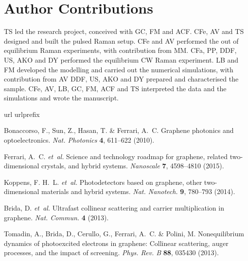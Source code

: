 \documentclass[aps, prl,twocolumn]{revtex4}
\begin{document}
\section*{Author Contributions}
TS led the research project, conceived with GC, FM and ACF.
CFe, AV and TS designed and built the pulsed Raman setup.
CFe and AV performed the out of equilibrium Raman experiments, with contribution from MM.
CFa, PP, DDF, US, AKO and DY performed the equilibrium CW Raman experiment.
LB and FM developed the modelling and carried out the numerical simulations, with contribution from AV
DDF, US, AKO and DY prepared and characterised the sample.
CFe, AV, LB, GC, FM, ACF and TS interpreted the data and the simulations and wrote the manuscript.

\begin{thebibliography}{10}
	\expandafter\ifx\csname url\endcsname\relax
	\def\url#1{\texttt{#1}}\fi
	\expandafter\ifx\csname urlprefix\endcsname\relax\def\urlprefix{URL }\fi
	\providecommand{\bibinfo}[2]{#2}
	\providecommand{\eprint}[2][]{\url{#2}}
	
	\bibinfo{author}{Bonaccorso, F.}, \bibinfo{author}{Sun, Z.},
	\bibinfo{author}{Hasan, T.} \& \bibinfo{author}{Ferrari, A.~C.}
	\newblock \bibinfo{title}{Graphene photonics and optoelectronics}.
	\newblock \emph{\bibinfo{journal}{Nat. Photonics}} \textbf{\bibinfo{volume}{4}},
	\bibinfo{pages}{611--622} (\bibinfo{year}{2010}).
	
	\bibinfo{author}{Ferrari, A.~C.} \emph{et~al.}
	\newblock \bibinfo{title}{Science and technology roadmap for graphene{,}
		related two-dimensional crystals{,} and hybrid systems}.
	\newblock \emph{\bibinfo{journal}{Nanoscale}} \textbf{\bibinfo{volume}{7}},
	\bibinfo{pages}{4598--4810} (\bibinfo{year}{2015}).
	
	\bibinfo{author}{Koppens, F. H.~L.} \emph{et~al.}
	\newblock \bibinfo{title}{Photodetectors based on graphene, other
		two-dimensional materials and hybrid systems}.
	\newblock \emph{\bibinfo{journal}{Nat. Nanotech.}}
	\textbf{\bibinfo{volume}{9}}, \bibinfo{pages}{780--793}
	(\bibinfo{year}{2014}).
	
	\bibinfo{author}{Brida, D.} \emph{et~al.}
	\newblock \bibinfo{title}{Ultrafast collinear scattering and carrier
		multiplication in graphene}.
	\newblock \emph{\bibinfo{journal}{Nat. Commun.}} \textbf{\bibinfo{volume}{4}}
	(\bibinfo{year}{2013}).
	
	\bibinfo{author}{Tomadin, A.}, \bibinfo{author}{Brida, D.},
	\bibinfo{author}{Cerullo, G.}, \bibinfo{author}{Ferrari, A.~C.} \&
	\bibinfo{author}{Polini, M.}
	\newblock \bibinfo{title}{Nonequilibrium dynamics of photoexcited electrons in
		graphene: Collinear scattering, auger processes, and the impact of
		screening}.
	\newblock \emph{\bibinfo{journal}{Phys. Rev. B}} \textbf{\bibinfo{volume}{88}},
	\bibinfo{pages}{035430} (\bibinfo{year}{2013}).
	

\end{thebibliography}
\end{document}
